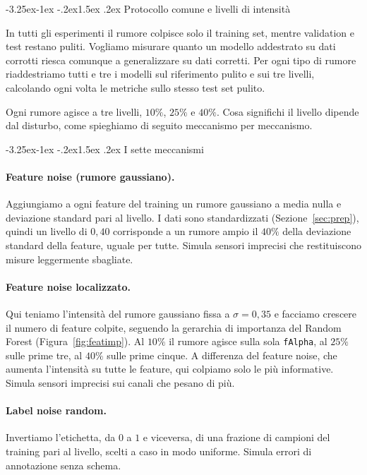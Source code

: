 \documentclass[12pt,a4paper]{article}
\makeatletter
\renewcommand\subsection{\@startsection{subsection}{2}{\z@}%
  {-3.25ex\@plus -1ex \@minus -.2ex}{1.5ex \@plus .2ex}%
  {\normalfont\large\bfseries}}
\makeatother
\begin{document}
\subsection{Protocollo comune e livelli di intensità}

In tutti gli esperimenti il rumore colpisce solo il training set, mentre validation e test restano
puliti. Vogliamo misurare quanto un modello addestrato su dati corrotti riesca comunque a generalizzare
su dati corretti. Per ogni tipo di rumore riaddestriamo tutti e tre i modelli sul riferimento pulito e
sui tre livelli, calcolando ogni volta le metriche sullo stesso test set pulito.

Ogni rumore agisce a tre livelli, $10\%$, $25\%$ e $40\%$. Cosa
significhi il livello dipende dal disturbo, come spieghiamo di seguito meccanismo per meccanismo.

\subsection{I sette meccanismi}

\paragraph{Feature noise (rumore gaussiano).} Aggiungiamo a ogni feature del training un rumore
gaussiano a media nulla e deviazione standard pari al livello. I dati sono standardizzati
(Sezione~\ref{sec:prep}), quindi un livello di $0{,}40$ corrisponde a un rumore ampio il $40\%$ della
deviazione standard della feature, uguale per tutte. Simula sensori imprecisi che restituiscono misure
leggermente sbagliate.

\paragraph{Feature noise localizzato.} Qui teniamo l'intensità del rumore gaussiano fissa a
$\sigma = 0{,}35$ e facciamo crescere il numero di feature colpite, seguendo la gerarchia di importanza
del Random Forest (Figura~\ref{fig:featimp}). Al $10\%$ il rumore agisce sulla sola \texttt{fAlpha}, al
$25\%$ sulle prime tre, al $40\%$ sulle prime cinque. A differenza del feature noise, che aumenta
l'intensità su tutte le feature, qui colpiamo solo le più informative. Simula sensori imprecisi sui
canali che pesano di più.

\paragraph{Label noise random.} Invertiamo l'etichetta, da $0$ a $1$ e viceversa, di una frazione di
campioni del training pari al livello, scelti a caso in modo uniforme. Simula errori di annotazione
senza schema.
\end{document}
